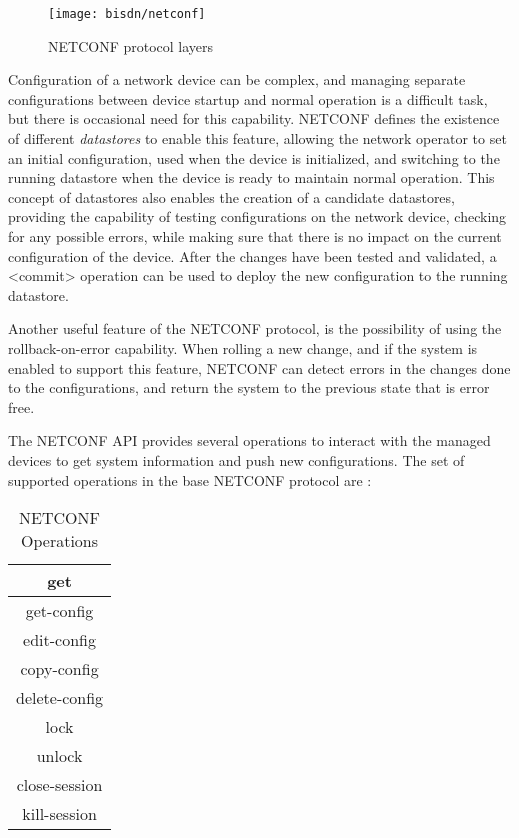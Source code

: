 \begin{figure} [!htbp]
    \centering
    \texttt{[image: bisdn/netconf]}
    \caption{NETCONF protocol layers \cite{enns_network_2011}}
    \label{fig:netconf_proto_layers}
\end{figure}

\par Configuration of a network device can be complex, and managing separate configurations between device startup and normal operation is a difficult task, but
there is occasional need for this capability. NETCONF defines the existence of different \textit{datastores} to enable this feature, allowing the network operator to
set an initial configuration, used when the device is initialized, and switching to the running datastore when the device is ready to maintain normal operation. This
concept of datastores also enables the creation of a candidate datastores, providing the capability of testing configurations on the network device, checking for any
possible errors, while making sure that there is no impact on the current configuration of the device. After the changes have been tested and validated, a <commit>
operation can be used to deploy the new configuration to the running datastore.

\par Another useful feature of the NETCONF protocol, is the possibility of using the rollback-on-error capability. When rolling a new change,
and if the system is enabled to support this feature, NETCONF can detect errors in the changes done to the configurations, and return the system to the previous
state that is error free. 

\par The NETCONF API provides several operations to interact with the managed devices to get system information and push new configurations. The set of supported 
operations in the base NETCONF protocol are \cite{enns_network_2011}:

\begin{table}[H]
    \centering
    \caption{NETCONF Operations}
    \begin{tabular}{c}
       get  \\ \hline
       get-config  \\ \hline
       edit-config  \\ \hline
       copy-config  \\ \hline
       delete-config  \\ \hline
       lock  \\ \hline
       unlock  \\ \hline
       close-session  \\ \hline
       kill-session  
    \end{tabular}
\end{table}

